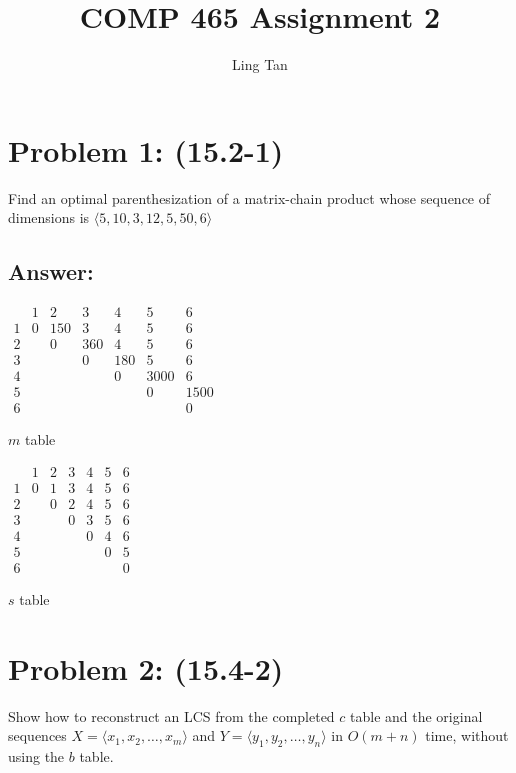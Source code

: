 \documentclass[a4paper]{article}
\title{COMP 465 Assignment 2}
\author{Ling Tan}
\begin{document}
\maketitle

\section*{Problem 1: (15.2-1)} Find an optimal parenthesization of a matrix-chain product whose sequence of dimensions is $\langle5, 10, 3, 12, 5, 50, 6\rangle$
\subsection*{Answer:}
\begin{table}[H]
    \centering
    $
    \begin{array}{c|cccccc}
     & 1 & 2 & 3 & 4 & 5 & 6\\
    \hline
     1 & 0 & 150 & 3 & 4 & 5 & 6\\
     2 &   & 0 & 360 & 4 & 5 & 6\\
     3 &   &   & 0 & 180 & 5 & 6\\
     4 &   &   &   & 0 & 3000 & 6\\
     5 &   &   &   &   & 0 & 1500\\
     6 &   &   &   &   &   & 0
    \end{array}
    $
    \caption{$m$ table}
    \label{tab:my_label}
\end{table}
\begin{table}[H]
    \centering
    $
    \begin{array}{c|cccccc}
     & 1 & 2 & 3 & 4 & 5 & 6\\
    \hline
     1 & 0 & 1 & 3 & 4 & 5 & 6\\
     2 &   & 0 & 2 & 4 & 5 & 6\\
     3 &   &   & 0 & 3 & 5 & 6\\
     4 &   &   &   & 0 & 4 & 6\\
     5 &   &   &   &   & 0 & 5\\
     6 &   &   &   &   &   & 0
    \end{array}
    $
    \caption{$s$ table}
    \label{tab:my_label}
\end{table}


\section*{Problem 2: (15.4-2) } Show how to reconstruct an LCS from the completed $c$ table and the original sequences $X = \langle x_1, x_2,\dots, x_m\rangle$ and $Y = \langle y_1, y_2, \dots, y_n\rangle$ in $O(m +n)$ time, without using the $b$ table.
\end{document}
